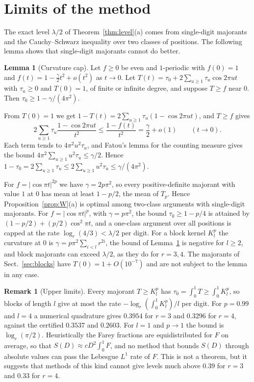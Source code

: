 \documentclass[11pt]{amsart}
\makeatletter
\theoremstyle{definition}
\newtheorem{lemma}[theorem]{Lemma}
\newtheorem{remark}[theorem]{Remark}
\numberwithin{equation}{section}
\renewenvironment{proof}[1][\proofname]{\par\pushQED{\qed}\normalfont\topsep6\p@\@plus6\p@\relax\trivlist\item[\hskip\labelsep\upshape#1.]\ignorespaces}{\popQED\endtrivlist\@endpefalse}
\makeatother
\begin{document}
\section{Limits of the method}\label{sec:limits}

The exact level $\lambda/2$ of Theorem~\ref{thm:level}(a) comes from single-digit majorants and the Cauchy--Schwarz inequality over two classes of positions. The following lemma shows that single-digit majorants cannot do better.

\begin{lemma}[Curvature cap]\label{lem:cap}
Let $f\ge0$ be even and $1$-periodic with $f(0)=1$ and $f(t)=1-\frac\gamma2t^2+o(t^2)$ as $t\to0$. Let $T(t)=\tau_0+2\sum_{u\ge1}\tau_u\cos2\pi ut$ with $\tau_u\ge0$ and $T(0)=1$, of finite or infinite degree, and suppose $T\ge f$ near $0$. Then $\tau_0\ge1-\gamma/(4\pi^2)$.
\end{lemma}

\begin{proof}
From $T(0)=1$ we get $1-T(t)=2\sum_{u\ge1}\tau_u(1-\cos2\pi ut)$, and $T\ge f$ gives
\[
2\sum_{u\ge1}\tau_u\frac{1-\cos2\pi ut}{t^2}\le\frac{1-f(t)}{t^2}=\frac\gamma2+o(1)\qquad(t\to0).
\]
Each term tends to $4\pi^2u^2\tau_u$, and Fatou's lemma for the counting measure gives the bound $4\pi^2\sum_{u\ge1}u^2\tau_u\le\gamma/2$. Hence $1-\tau_0=2\sum_{u\ge1}\tau_u\le2\sum_{u\ge1}u^2\tau_u\le\gamma/(4\pi^2)$.
\end{proof}

For $f=\lvert\cos\pi t\rvert^{2p}$ we have $\gamma=2p\pi^2$, so every positive-definite majorant with value $1$ at $0$ has mean at least $1-p/2$, the mean of $T_p$. Hence Proposition~\ref{prop:W}(a) is optimal among two-class arguments with single-digit majorants. For $f=\lvert\cos\pi t\rvert^p$, with $\gamma=p\pi^2$, the bound $\tau_0\ge1-p/4$ is attained by $(1-p/2)+(p/2)\cos^2\pi t$, and a one-class argument over all positions is capped at the rate $\log_r(4/3)<\lambda/2$ per digit. For a block kernel $K_l^p$ the curvature at $0$ is $\gamma=p\pi^2\sum_{i<l}r^{2i}$, the bound of Lemma~\ref{lem:cap} is negative for $l\ge2$, and block majorants can exceed $\lambda/2$, as they do for $r=3,4$. The majorants of Sect.~\ref{sec:blocks} have $T(0)=1+O(10^{-7})$ and are not subject to the lemma in any case.

\begin{remark}[Upper limits]\label{rem:limits}
Every majorant $T\ge K_l^p$ has $\tau_0=\int_0^1T\ge\int_0^1K_l^p$, so blocks of length $l$ give at most the rate $-\log_r(\int_0^1K_l^p)/l$ per digit. For $p=0.99$ and $l=4$ a numerical quadrature gives $0.3954$ for $r=3$ and $0.3296$ for $r=4$, against the certified $0.3537$ and $0.2603$. For $l=1$ and $p\to1$ the bound is $\log_r(\pi/2)$. Heuristically the Farey fractions are equidistributed for $F$ on average, so that $S(D)\approx cD^2\int_0^1F$, and no method that bounds $S(D)$ through absolute values can pass the Lebesgue $L^1$ rate of $F$. This is not a theorem, but it suggests that methods of this kind cannot give levels much above $0.39$ for $r=3$ and $0.33$ for $r=4$.
\end{remark}
\end{document}
